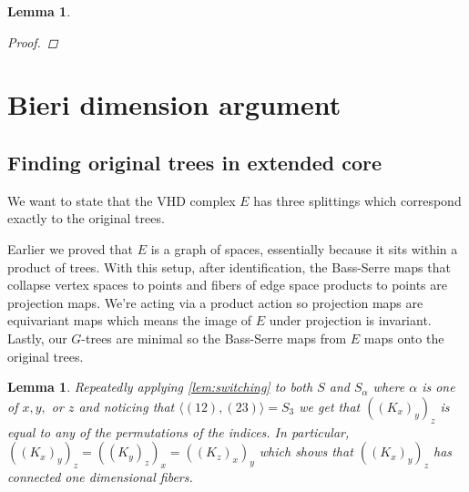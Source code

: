 \documentclass[12pt,parskip=full]{report}
\theoremstyle{plain}
\newtheorem{lem}[thm]{Lemma}
\theoremstyle{definition}
\newcommand{\sxyz}{((K_x)_y)_z}
\newcommand{\Sxyz}[3]{((K_#1)_#2)_#3}
\begin{document}
\begin{lem}
\begin{proof}
    

    \end{proof}
\end{lem}

\section{Bieri dimension argument}

\subsection{Finding original trees in extended core}
We want to state that the VHD complex \(E\) has three splittings which correspond exactly to the original trees.

Earlier we proved that \(E\) is a graph of spaces, essentially because it sits within a product of trees. With this setup, after identification, the Bass-Serre maps that collapse vertex spaces to points and fibers of edge space products to points are projection maps. We're acting via a product action so projection maps are equivariant maps which means the image of \(E\) under projection is invariant. Lastly, our \(G\)-trees are minimal so the Bass-Serre maps from \(E\) maps onto the original trees.

\begin{lem}
    \label{lem:boximp} 
    Repeatedly applying \ref{lem:switching} to both \(S\) and \(S_{\alpha}\) where \(\alpha\) is one of \(x,y,\) or \(z\)  and noticing that \(\langle (12),(23) \rangle = S_{3}\) we get that \(\sxyz\) is equal to any of the permutations of the indices. In particular, \(\Sxyz{x}{y}{z}=\Sxyz{y}{z}{x}=\Sxyz{z}{x}{y}\) which shows that \(\sxyz\) has connected one dimensional fibers.
\end{lem}
\end{document}
